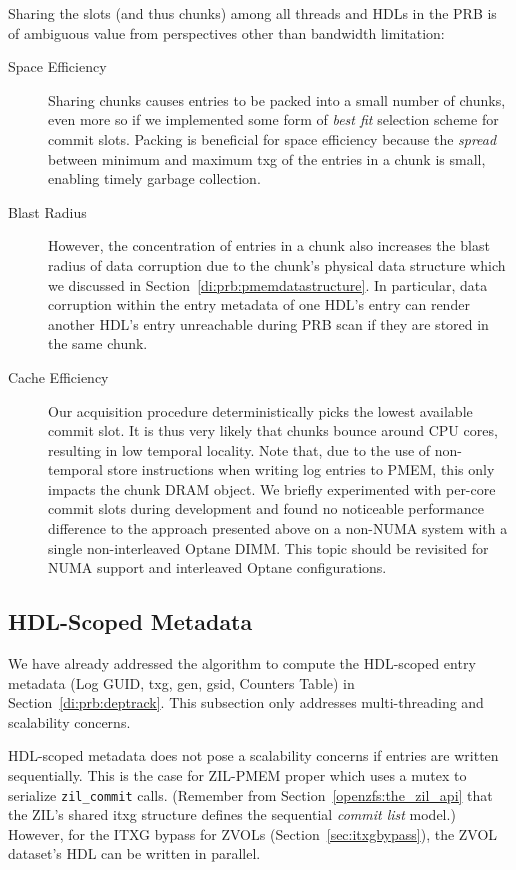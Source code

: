 \documentclass[12pt,a4paper,twoside]{book}
\begin{document}
Sharing the slots (and thus chunks) among all threads and HDLs in the PRB is of ambiguous value from perspectives other than bandwidth limitation:
\begin{description}
    \item[Space Efficiency]
        Sharing chunks causes entries to be packed into a small number of chunks, even more so if we implemented some form of \textit{best fit} selection scheme for commit slots.
        Packing is beneficial for space efficiency because the \textit{spread} between minimum and maximum txg of the entries in a chunk is small, enabling timely garbage collection.
    \item[Blast Radius]
        However, the concentration of entries in a chunk also increases the blast radius of data corruption due to the chunk's physical data structure which we discussed in Section~\ref{di:prb:pmemdatastructure}.
        In particular, data corruption within the entry metadata of one HDL's entry can render another HDL's entry unreachable during PRB scan if they are stored in the same chunk.
    \item[Cache Efficiency] Our acquisition procedure deterministically picks the lowest available commit slot.
        It is thus very likely that chunks bounce around CPU cores, resulting in low temporal locality.
        Note that, due to the use of non-temporal store instructions when writing log entries to PMEM, this only impacts the chunk DRAM object.
        We briefly experimented with per-core commit slots during development and found no noticeable performance difference to the approach presented above on a non-NUMA system with a single non-interleaved Optane DIMM.
        This topic should be revisited for NUMA support and interleaved Optane configurations.
\end{description}

\subsection{HDL-Scoped Metadata}\label{di:prb:write:hdlscoped}
We have already addressed the algorithm to compute the HDL-scoped entry metadata (Log GUID, txg, gen, gsid, Counters Table) in Section~\ref{di:prb:deptrack}.
This subsection only addresses multi-threading and scalability concerns.

HDL-scoped metadata does not pose a scalability concerns if entries are written sequentially.
This is the case for ZIL-PMEM proper which uses a mutex to serialize \lstinline{zil_commit} calls.
(Remember from Section~\ref{openzfs:the_zil_api} that the ZIL's shared itxg structure defines the sequential \textit{commit list} model.)
However, for the ITXG bypass for ZVOLs (Section~\ref{sec:itxgbypass}), the ZVOL dataset's HDL can be written in parallel.
\end{document}

